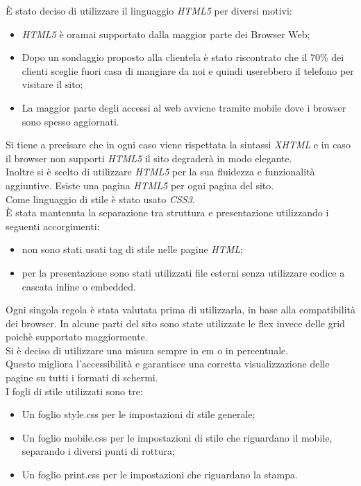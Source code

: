 È stato deciso di utilizzare il linguaggio \emph{HTML5} per diversi motivi:
\begin{itemize} %
	\item \emph{HTML5} è oramai supportato dalla maggior parte dei Browser Web;
	\item Dopo un sondaggio proposto alla clientela è stato riscontrato che il 70\% dei clienti sceglie fuori casa di mangiare da noi e quindi userebbero il telefono per visitare il sito;
	\item La maggior parte degli accessi al web avviene tramite mobile dove i browser sono spesso aggiornati.
\end{itemize}
Si tiene a precisare che in ogni caso viene rispettata la sintassi \emph{XHTML} e in caso il browser non supporti \emph{HTML5} il sito degraderà in modo elegante.\\
Inoltre si è scelto di utilizzare \emph{HTML5} per la sua fluidezza e funzionalità aggiuntive. %
Esiste una pagina \emph{HTML5} per ogni pagina del sito.\\ %
Come linguaggio di stile è stato usato \emph{CSS3}.\\
È stata mantenuta la separazione tra struttura e presentazione utilizzando i seguenti accorgimenti: 
\begin{itemize}
    \item non sono stati usati tag di stile nelle pagine \emph{HTML};
    \item per la presentazione sono stati utilizzati file esterni senza utilizzare codice a cascata inline o embedded.
\end{itemize}
Ogni singola regola è stata valutata prima di utilizzarla, in base alla compatibilità dei browser.
In alcune parti del sito sono state utilizzate le flex invece delle grid poichè supportato maggiormente.\\
Si è deciso di utilizzare una misura sempre in em o in percentuale.\\
Questo migliora l'accessibilità e garantisce una corretta visualizzazione delle pagine su tutti i formati di schermi.\\
I fogli di stile utilizzati sono tre:
\begin{itemize}
	\item Un foglio style.css per le impostazioni di stile generale;
	\item Un foglio mobile.css per le impostazioni di stile che riguardano il mobile, separando i diversi punti di rottura; %
	\item Un foglio print.css per le impostazioni che riguardano la stampa.
\end{itemize}